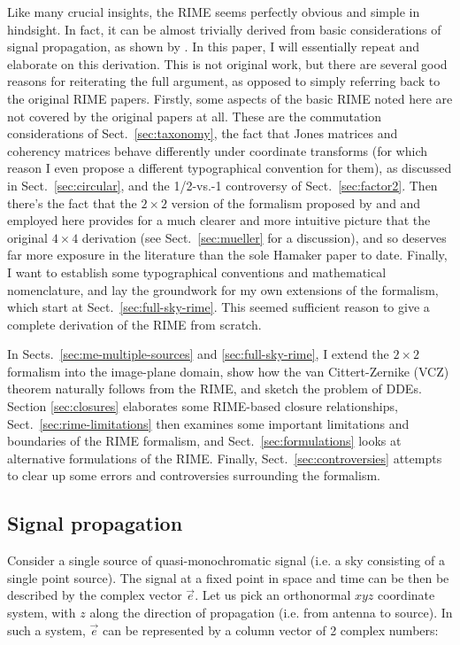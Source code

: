 \documentclass[referee]{aa}
\begin{document}
Like many crucial insights, the RIME seems perfectly obvious and simple in hindsight. In fact, it can be almost trivially derived from basic considerations of signal propagation, as shown by \citet{ME1}. In this paper, I will essentially repeat and elaborate on this derivation. This is not original work, but there are several good reasons for reiterating the full argument, as opposed to simply referring back to the original RIME papers. Firstly, some aspects of the basic RIME noted here are not covered by the original papers at all. These are the commutation considerations of Sect.~\ref{sec:taxonomy}, the fact that Jones matrices and coherency matrices behave differently under coordinate transforms (for which reason I even propose a different typographical convention for them), as discussed in Sect.~\ref{sec:circular}, and the 1/2-vs.-1 controversy of Sect.~\ref{sec:factor2}. Then there's the fact that the $2\times2$ version of the formalism proposed by \citet{ME4} and and employed here provides for a much clearer and more intuitive picture that the original $4\times4$ derivation (see Sect.~\ref{sec:mueller} for a discussion), and so deserves far more exposure in the literature than the sole Hamaker paper to date. Finally, I want to establish some typographical conventions and mathematical nomenclature, and lay the groundwork for my own extensions of the formalism, which start at Sect.~\ref{sec:full-sky-rime}. This seemed sufficient reason to give a complete derivation of the RIME from scratch.

In Sects.~\ref{sec:me-multiple-sources} and \ref{sec:full-sky-rime}, I extend the $2\times2$ formalism into the image-plane domain, show how the van Cittert-Zernike (VCZ) theorem naturally follows from the RIME, and sketch the problem of DDEs. Section \ref{sec:closures} elaborates some RIME-based closure relationships, Sect.~\ref{sec:rime-limitations} then examines some important limitations and boundaries of the RIME formalism, and Sect.~\ref{sec:formulations} looks at alternative formulations of the RIME. Finally, Sect.~\ref{sec:controversies} attempts to clear up some errors and controversies surrounding the formalism.


\subsection{Signal propagation}

Consider a single source of quasi-monochromatic signal (i.e. a sky consisting of a single point source). The signal at a fixed point in space and time can be then be described by the complex vector $\vec e$. Let us pick an orthonormal $xyz$ coordinate system, with $z$ along the direction of propagation (i.e. from antenna to source). In such a system, $\vec e$ can be represented by a column vector of 2 complex numbers:
\end{document}
